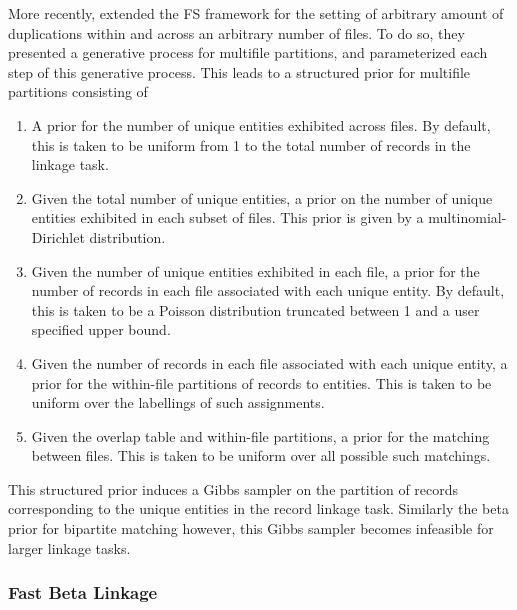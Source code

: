 \documentclass[12pt,letterpaper]{article}
\newcommand{\1}[1]{\mathbb{I}\!\left[#1\right]} %
\begin{document}
More recently, \cite{aleshin2023multifile} extended the FS framework for the setting of arbitrary amount of duplications within and across an arbitrary number of files. To do so, they presented a generative process for multifile partitions, and parameterized each step of this generative process. This leads to a structured prior for multifile partitions consisting of
\begin{enumerate}
	\item A prior for the number of unique entities exhibited across files. By default, this is taken to be uniform from 1 to the total number of records in the linkage task.
	\item Given the total number of unique entities, a prior on the number of unique entities exhibited in each subset of files. This prior is given by a multinomial-Dirichlet distribution.
	\item Given the number of unique entities exhibited in each file, a prior for the number of records in each file associated with each unique entity. By default, this is taken to be a Poisson distribution truncated between 1 and a user specified upper bound.
	\item Given the number of records in each file associated with each unique entity, a prior for the within-file partitions of records to entities. This is taken to be uniform over the labellings of such assignments.
	\item Given the overlap table and within-file partitions, a prior for the matching between files. This is taken to be uniform over all possible such matchings. 
\end{enumerate}
This structured prior induces a Gibbs sampler on the partition of records corresponding to the unique entities in the record linkage task. Similarly the beta prior for bipartite matching however, this Gibbs sampler becomes infeasible for larger linkage tasks. 

\subsubsection{Fast Beta Linkage}\label{sec:fabl}
\end{document}
